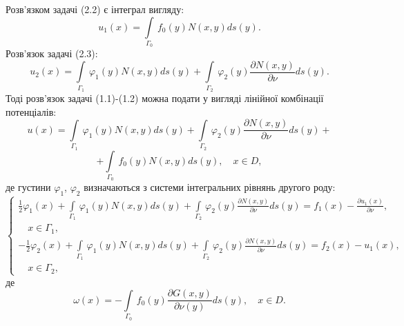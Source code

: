 \documentclass[a4 paper,12pt,ukrainian]{report}
\begin{document}
\hspace*{\parindent}Розв'язком задачі (2.2) є інтеграл вигляду:
\begin{equation}
u_{1}(x) = \int\limits_{\Gamma_{0}} \, f_{0}(y)N(x,y) ds(y). 
\end{equation}
\hspace*{\parindent}Розв'язок задачі (2.3):
\begin{equation}
u_{2}(x) = \int\limits_{\Gamma_{1}} \, \varphi_{1}(y)N(x,y)ds(y)+\int\limits_{\Gamma_{2}} \, \varphi_{2}(y)\frac{\partial N(x,y)}{\partial\nu}ds(y). 
\end{equation}
\hspace*{\parindent}Тоді розв'язок задачі (1.1)-(1.2) можна подати у вигляді лінійної комбінації потенціалів:
\begin{equation}
u(x) = \int\limits_{\Gamma_{1}} \, \varphi_{1}(y)N(x,y)ds(y)+\int\limits_{\Gamma_{2}} \, \varphi_{2}(y)\frac{\partial N(x,y)}{\partial\nu}ds(y)+
\end{equation}
\begin{equation*}
+\int\limits_{\Gamma_{0}} \, f_{0}(y)N(x,y) ds(y), \quad x \in D,
\end{equation*}
де густини $\varphi_{1}$, $\varphi_{2}$ визначаються з системи інтегральних рівнянь другого роду:
\begin{equation}\label{13}
 \left\{
\begin{array}{c}
   \displaystyle
\frac{1}{2}\varphi_{1}(x) + \int\limits_{\Gamma_1} \, \varphi_1(y)N(x,y)ds(y)+\int\limits_{\Gamma_2} \, \varphi_2(y)\frac{\partial N(x,y)}{\partial\nu}ds(y)=f_1(x)-\frac{\partial u_{1}(x)}{\partial\nu},\\ \quad x\in \Gamma_1,\\

	\displaystyle
  -\frac{1}{2}\varphi_{2}(x) + \int\limits_{\Gamma_1} \, \varphi_1(y)N(x,y)ds(y)+\int\limits_{\Gamma_2} \, \varphi_2(y)\frac{\partial N(x,y)}{\partial\nu}ds(y)=f_2(x)-u_{1}(x),\\ \quad x\in \Gamma_2,
 \end{array}
\right.
\end{equation}
де
\begin{equation*}
\omega(x) = -\int\limits_{\Gamma_0} \, f_0(y)\frac{\partial G(x,y)}{\partial \nu(y)} ds(y) , \quad x \in D .
\end{equation*}


\newpage
\end{document}
